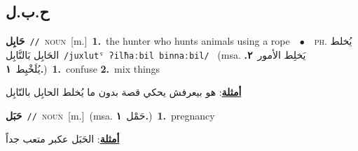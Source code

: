 \documentclass[10pt,a4paper,twoside]{article} %
\begin{document}
\begin{multicols}{2}
{{{{{{\vspace{-3mm}
\subsection*{\color{blue}\foreignlanguage{arabic}{ح.ب.ل}\color{blue}{}} 

{\setlength\topsep{0pt}\textbf{\foreignlanguage{arabic}{حَابِل}}\ {\color{gray}\texttt{//}\color{black}}\ \textsc{noun}\ [m.]\ \textbf{1.}~the hunter who hunts animals using a rope\ \ $\bullet$\ \ \textsc{ph.} \color{gray} \foreignlanguage{arabic}{يُخلط الحَابِل بَالنَّابِل}\color{black}\ {\color{gray}\texttt{/{\sffamily juxlutˤ ʔilħaːbil binnaːbil}/}\color{black}}\ \color{gray} (msa. \foreignlanguage{arabic}{يَخلِط الأمور}~\foreignlanguage{arabic}{\textbf{٢.}}  \foreignlanguage{arabic}{يُلَخْبِط}~\foreignlanguage{arabic}{\textbf{١.}})\color{black}\ \textbf{1.}~confuse  \textbf{2.}~mix things\  \begin{flushright}\color{gray}\foreignlanguage{arabic}{\textbf{\underline{\foreignlanguage{arabic}{أمثلة}}}: هو بيعرفش يحكي قصة بدون ما يُخلط الحابِل بالنّابِل}\end{flushright}\color{black}} \vspace{2mm}

{\setlength\topsep{0pt}\textbf{\foreignlanguage{arabic}{حَبَل}}\ {\color{gray}\texttt{//}\color{black}}\ \textsc{noun}\ [m.]\ \color{gray}(msa. \foreignlanguage{arabic}{حَمْل}~\foreignlanguage{arabic}{\textbf{١.}})\color{black}\ \textbf{1.}~pregnancy\  \begin{flushright}\color{gray}\foreignlanguage{arabic}{\textbf{\underline{\foreignlanguage{arabic}{أمثلة}}}: الحَبَل عكبر متعب جداً}\end{flushright}\color{black}} \vspace{2mm}

}}}}}}
\end{multicols}
\end{document}
